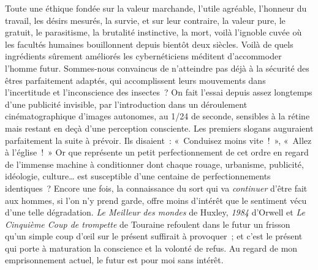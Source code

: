 \documentclass[french,twoside]{book} %
\newcommand{\astermono}{\medskip\centerline{\color{rubric}\large\selectfont{\syms ✻}}\medskip\par}%
\begin{document}
Toute une éthique fondée sur la valeur marchande, l’utile agréable, l’honneur du travail, les désirs mesurés, la survie, et sur leur contraire, la valeur pure, le gratuit, le parasitisme, la brutalité instinctive, la mort, voilà l’ignoble cuvée où les facultés humaines bouillonnent depuis bientôt deux siècles. Voilà de quels ingrédients sûrement améliorés les cybernéticiens méditent d’accommoder l’homme futur. Sommes-nous convaincus de n’atteindre pas déjà à la sécurité des êtres parfaitement adaptés, qui accomplissent leurs mouvements dans l’incertitude et l’inconscience des insectes ? On fait l’essai depuis assez longtemps d’une publicité invisible, par l’introduction dans un déroulement cinématographique d’images autonomes, au 1/24 de seconde, sensibles à la rétine mais restant en deçà d’une perception consciente. Les premiers slogans auguraient parfaitement la suite à prévoir. Ils disaient : « Conduisez moins vite ! », « Allez à l’église ! » Or que représente un petit perfectionnement de cet ordre en regard de l’immense machine à conditionner dont chaque rouage, urbanisme, publicité, idéologie, culture… est susceptible d’une centaine de perfectionnements identiques ? Encore une fois, la connaissance du sort qui va \emph{continuer} d’être fait aux hommes, si l’on n’y prend garde, offre moins d’intérêt que le sentiment vécu d’une telle dégradation. \emph{Le Meilleur des mondes} de Huxley, \emph{1984} d’Orwell et \emph{Le Cinquième Coup de trompette} de Touraine refoulent dans le futur un frisson qu’un simple coup d’œil sur le présent suffirait à provoquer ; et c’est le présent qui porte à maturation la conscience et la volonté de refus. Au regard de mon emprisonnement actuel, le futur est pour moi sans intérêt.\par

\astermono
\end{document}
